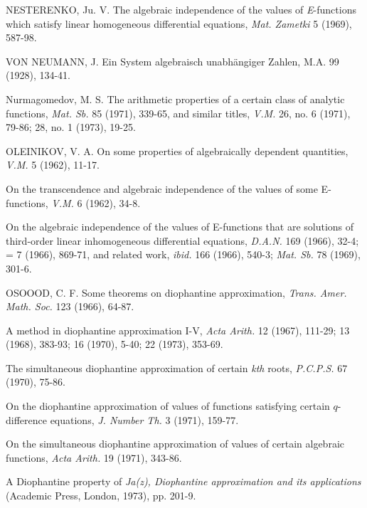 \begin{hanglist}
    \item NESTERENKO, Ju. V. The algebraic independence of the values of \textit{E}-functions which satisfy linear homogeneous differential equations, \textit{Mat. Zametki} 5 (1969), 587-98.
    \item VON NEUMANN, J. Ein System algebraisch unabhängiger Zahlen, M.A. 99 (1928), 134-41.
    \item Nurmagomedov, M. S. The arithmetic properties of a certain class of analytic functions, \textit{Mat. Sb.} 85 (1971), 339-65, and similar titles, \textit{V.M.} 26, no. 6 (1971), 79-86; 28, no. 1 (1973), 19-25.
    \item OLEINIKOV, V. A. On some properties of algebraically dependent quantities, \textit{V.M.} 5 (1962), 11-17.
    \item \hspace{1.5em} On the transcendence and algebraic independence of the values of some E-functions, \textit{V.M.} 6 (1962), 34-8.
    \item \hspace{1.5em} On the algebraic independence of the values of E-functions that are solutions of third-order linear inhomogeneous differential equations, \textit{D.A.N.} 169 (1966), 32-4; = 7 (1966), 869-71, and related work, \textit{ibid.} 166 (1966), 540-3; \textit{Mat. Sb.} 78 (1969), 301-6.
    \item OSOOOD, C. F. Some theorems on diophantine approximation, \textit{Trans. Amer. Math. Soc.} 123 (1966), 64-87.
    \item \hspace{1.5em} A method in diophantine approximation I-V, \textit{Acta Arith.} 12 (1967), 111-29; 13 (1968), 383-93; 16 (1970), 5-40; 22 (1973), 353-69.
    \item \hspace{1.5em} The simultaneous diophantine approximation of certain \textit{kth} roots, \textit{P.C.P.S.} 67 (1970), 75-86.
    \item \hspace{1.5em} On the diophantine approximation of values of functions satisfying certain $q$-difference equations, \textit{J. Number Th.} 3 (1971), 159-77.
    \item \hspace{1.5em} On the simultaneous diophantine approximation of values of certain algebraic functions, \textit{Acta Arith.} 19 (1971), 343-86.
    \item \hspace{1.5em} A Diophantine property of \textit{Ja(z), Diophantine approximation and its applications} (Academic Press, London, 1973), pp. 201-9.

\end{hanglist}
